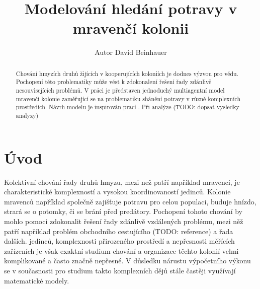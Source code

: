 \documentclass[10pt,a4paper,twocolumn]{article}
\begin{document}
\providecommand{\ShortAuthorList}[0]{A.~M.~Surname, B.~D.~Suffix Jr., C.~G. Suffix III} %
\title{Modelování hledání potravy v mravenčí kolonii}
\author[1]{Autor David Beinhauer}

\date{\dateline{}}

\begin{abstract}
\noindent
Chování hmyzích druhů žijících v kooperujících koloniích je dodnes 
výzvou pro vědu. Pochopení této problematiky může vést k zdokonalení řešení
řady zdánlivě nesouvisejících problémů. V práci je představen jednoduchý
multiagentní model mravenčí kolonie zaměřující se na problematiku shánění
potravy v různě komplexních prostředích. Návrh modelu je inspirován prací 
\citet{jones2010characteristics}. 
Při analýze (TODO: dopsat vysledky analyzy)


\DOI{} %
\end{abstract}

\maketitle
\thispagestyle{titlestyle}



\section*{Úvod}

Kolektivní chování řady druhů hmyzu, mezi než patří například mravenci,
je charakteristické komplexností a vysokou koordinovaností jedinců. Kolonie
mravenců například společně zajišťuje potravu pro celou populaci, buduje hnízdo,
strará se o potomky, či se brání před predátory. Pochopení tohoto chování by
mohlo pomoci zdokonalit řešení řady zdánlivě vzdálených problému, mezi něž
patří například problém obchodního cestujícího (TODO: reference) a řada dalších. 
jedinců, komplexnosti přirozeného prostředí a nepřesnosti měřících zařízeních 
je však exaktní studium chování a organizace těchto kolonií velmi komplikované a 
často značně nepřesné. V důsledku nárustu výpočetního výkonu se v současnosti 
pro studium takto komplexních dějů stále častěji využívají matematické modely. 
\end{document}
